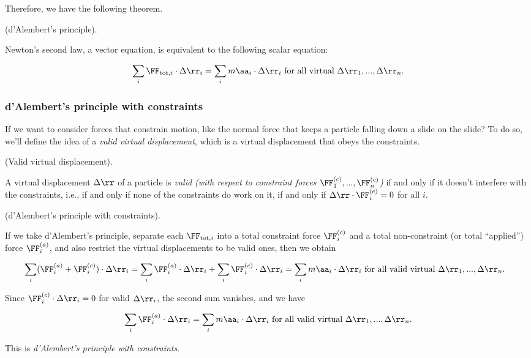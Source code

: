 \documentclass{article}
\begin{document}
Therefore, we have the following theorem.

\begin{theorem}
    (d'Alembert's principle).

    Newton's second law, a vector equation, is equivalent to the following scalar equation:

    \begin{align*}
        \sum_i \FF_{\text{tot},i} \cdot \Delta \rr_i = \sum_i m\aa_i \cdot \Delta \rr_i \text{ for all virtual $\Delta \rr_1, ..., \Delta \rr_n$}.
    \end{align*}
\end{theorem}

\subsubsection*{d'Alembert's principle with constraints}

If we want to consider forces that constrain motion, like the normal force that keeps a particle falling down a slide on the slide? To do so, we'll define the idea of a \textit{valid virtual displacement}, which is a virtual displacement that obeys the constraints.

\begin{defn}
    (Valid virtual displacement).

    A virtual displacement $\Delta \rr$ of a particle is \textit{valid (with respect to constraint forces $\FF^{(c)}_1, ..., \FF^{(c)}_n$)} if and only if it doesn't interfere with the constraints, i.e., if and only if none of the constraints do work on it, if and only if  $\Delta \rr \cdot \FF^{(c)}_i = 0$ for all $i$.
\end{defn}

\begin{deriv}
    (d'Alembert's principle with constraints).

    If we take d'Alembert's principle, separate each $\FF_{\text{tot}, i}$ into a total constraint force $\FF^{(c)}_i$ and a total non-constraint (or total ``applied'') force $\FF^{(a)}_i$, and also restrict the virtual displacements to be valid ones, then we obtain

    \begin{align*}
        &\sum_i (\FF^{(a)}_i + \FF^{(c)}_i) \cdot \Delta \rr_i = \sum_i \FF^{(a)}_i \cdot \Delta \rr_i + \sum_i \FF^{(c)}_i \cdot \Delta \rr_i = \sum_i m \aa_i \cdot \Delta \rr_i \text{ for all valid virtual $\Delta \rr_1, ..., \Delta \rr_n$}.
    \end{align*}
    
    Since $\FF^{(c)}_i \cdot \Delta \rr_i = 0$ for valid $\Delta \rr_i$, the second sum vanishes, and we have
    
    \begin{align*}
        \sum_i \FF^{(a)}_i \cdot \Delta \rr_i = \sum_i m \aa_i \cdot \Delta \rr_i \text{ for all valid virtual $\Delta \rr_1, ..., \Delta \rr_n$}.
    \end{align*}

    This is \textit{d'Alembert's principle with constraints}.
\end{deriv}
\end{document}
